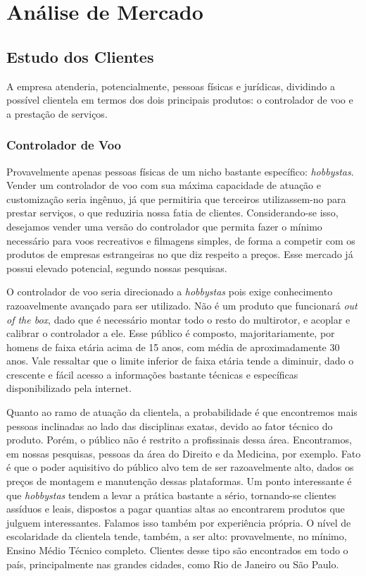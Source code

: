 \section{Análise de Mercado}

\subsection{Estudo dos Clientes}

A empresa atenderia, potencialmente, pessoas físicas e jurídicas, dividindo a possível clientela em termos
dos dois principais produtos: o controlador de voo e a prestação de serviços.

\subsubsection*{Controlador de Voo}

Provavelmente apenas pessoas físicas de um nicho bastante específico: \emph{hobbystas}. Vender um controlador
de voo com sua máxima capacidade de atuação e customização seria ingênuo, já que permitiria que terceiros utilizassem-no
para prestar serviços, o que reduziria nossa fatia de clientes. Considerando-se isso, desejamos vender uma versão
do controlador que permita fazer o mínimo necessário para voos recreativos e filmagens simples, de forma a competir
com os produtos de empresas estrangeiras no que diz respeito a preços. Esse mercado já possui elevado potencial, segundo
nossas pesquisas.

O controlador de voo seria direcionado a \emph{hobbystas} pois exige conhecimento razoavelmente avançado para ser utilizado.
Não é um produto que funcionará \emph{out of the box}, dado que é necessário montar todo o resto do multirotor, e acoplar e calibrar
o controlador a ele. Esse público é composto, majoritariamente, por homens de faixa etária acima de 15 anos, com média de aproximadamente
30 anos. Vale ressaltar que o limite inferior de faixa etária tende a diminuir, dado o crescente e fácil acesso a informações bastante técnicas
e específicas disponibilizado pela internet.

Quanto ao ramo de atuação da clientela, a probabilidade é que encontremos mais pessoas inclinadas ao lado das disciplinas exatas,
devido ao fator técnico do produto. Porém, o público não é restrito a profissinais dessa área. Encontramos, em nossas pesquisas,
pessoas da área do Direito e da Medicina, por exemplo. Fato é que o poder aquisitivo do público alvo tem de ser razoavelmente alto,
dados os preços de montagem e manutenção dessas plataformas. Um ponto interessante é que \emph{hobbystas} tendem a levar a prática
bastante a sério, tornando-se clientes assíduos e leais, dispostos a pagar quantias altas ao encontrarem produtos que julguem 
interessantes. Falamos isso também por experiência própria. O nível de escolaridade da clientela tende, também, a ser alto: 
provavelmente, no mínimo, Ensino Médio Técnico completo. Clientes desse tipo são encontrados em todo o país, principalmente nas
grandes cidades, como Rio de Janeiro ou São Paulo.

